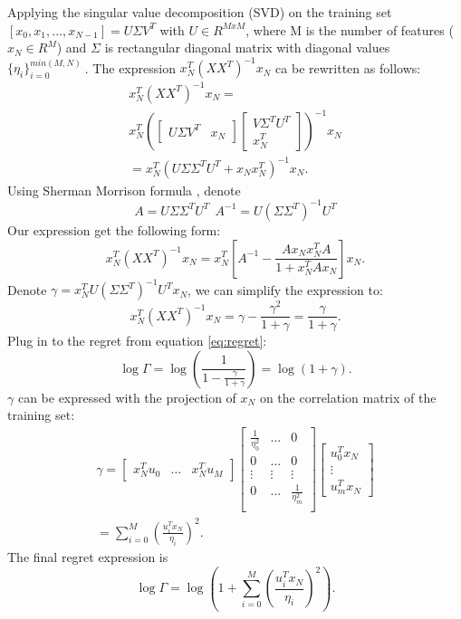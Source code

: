 \documentclass[letterpaper, 10 pt, conference]{ieeeconf}  %
\begin{document}
Applying the singular value decomposition (SVD) on the training set $[x_0,x_1, \hdots, x_{N-1}] = U \Sigma V^T$ with $U\in R^{MxM}$, where M is the number of features ($x_N \in R^M$) and $\Sigma$ is rectangular diagonal matrix with diagonal values $\{\eta_i\}_{i=0}^{min(M,N)} \ $. The expression $x_N^T(XX^T)^{-1}x_N$ ca be rewritten as follows:
\begin{multline}
x_N^T(XX^T)^{-1}x_N = \\
x_N^T\left(\begin{bmatrix} U \Sigma V^T & x_N \end{bmatrix}
\begin{bmatrix}
V \Sigma^T U^T \\ x_N^T
\end{bmatrix}
\right)^{-1}x_N \\
=  x_N^T\left(U \Sigma \Sigma^T U^T + x_N x_N^T\right)^{-1}x_N.
\end{multline}
Using Sherman Morrison formula \cite{press2007section}, denote 
\begin{equation}
A=U \Sigma \Sigma^T U^T \ \ A^{-1}=U (\Sigma \Sigma^T)^{-1} U^T   
\end{equation}
Our expression get the following form:
\begin{equation}
x_N^T(XX^T)^{-1}x_N = 
x_N^T \left[ A^{-1} -  \frac{ A x_N x_N^T  A}{1 + x_N^T  A x_N} \right] x_N.
\end{equation}
Denote $\gamma = x_N^T  U (\Sigma \Sigma^T)^{-1} U^T x_N$, we can simplify the expression to:
\begin{equation}
x_N^T(XX^T)^{-1}x_N = \gamma - \frac{\gamma^2}{1+\gamma} = \frac{\gamma}{1+\gamma}.
\end{equation}
Plug in to the regret from equation \ref{eq:regret}:
\begin{equation}
\log \Gamma = \log \left( \frac{1}{1-\frac{\gamma}{1+\gamma}} \right)
=  \log \left( 1+\gamma \right).
\end{equation}
$\gamma$ can be expressed with the projection of $x_N$ on the correlation matrix of the training set:
\begin{multline}
\gamma = 
\begin{bmatrix}
x_N^T u_0 & \hdots & x_N^T u_M
\end{bmatrix}
\begin{bmatrix}
\frac{1}{\eta_0^2} & \hdots & 0 \\
0 & \hdots &  0 \\
\vdots & \vdots &  \vdots \\
0 & \hdots &  \frac{1}{\eta_m^2} \\
\end{bmatrix}
\begin{bmatrix}
u_0^T x_N \\ \vdots \\ u_m^T x_N
\end{bmatrix} \\
= \sum_{i=0}^M \left(\frac{u_i^T x_N}{\eta_i}\right)^2.
\end{multline}
The final regret expression is
\begin{equation}
\log \Gamma = \log \left(1 +  \sum_{i=0}^M \left(\frac{u_i^T x_N}{\eta_i}\right)^2 \right).
\end{equation}
\end{document}
